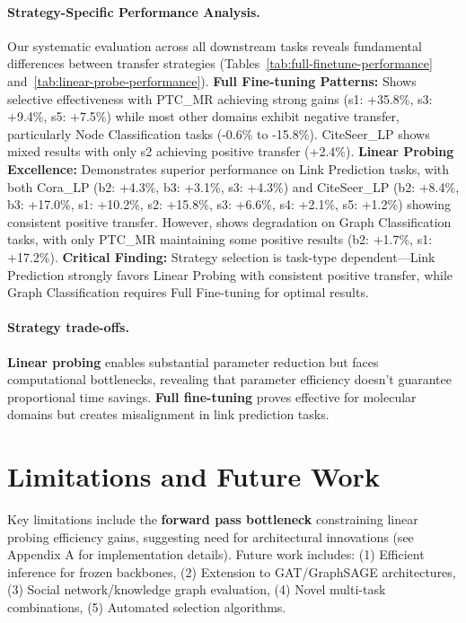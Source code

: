 \documentclass[11pt]{article}
\begin{document}
\paragraph{Strategy-Specific Performance Analysis.} Our systematic evaluation across all downstream tasks reveals fundamental differences between transfer strategies (Tables~\ref{tab:full-finetune-performance} and~\ref{tab:linear-probe-performance}). \textbf{Full Fine-tuning Patterns:} Shows selective effectiveness with PTC\_MR achieving strong gains (s1: +35.8\%, s3: +9.4\%, s5: +7.5\%) while most other domains exhibit negative transfer, particularly Node Classification tasks (-0.6\% to -15.8\%). CiteSeer\_LP shows mixed results with only s2 achieving positive transfer (+2.4\%). \textbf{Linear Probing Excellence:} Demonstrates superior performance on Link Prediction tasks, with both Cora\_LP (b2: +4.3\%, b3: +3.1\%, s3: +4.3\%) and CiteSeer\_LP (b2: +8.4\%, b3: +17.0\%, s1: +10.2\%, s2: +15.8\%, s3: +6.6\%, s4: +2.1\%, s5: +1.2\%) showing consistent positive transfer. However, shows degradation on Graph Classification tasks, with only PTC\_MR maintaining some positive results (b2: +1.7\%, s1: +17.2\%). \textbf{Critical Finding:} Strategy selection is task-type dependent—Link Prediction strongly favors Linear Probing with consistent positive transfer, while Graph Classification requires Full Fine-tuning for optimal results.


\paragraph{Strategy trade-offs.} \textbf{Linear probing} enables substantial parameter reduction but faces computational bottlenecks, revealing that parameter efficiency doesn't guarantee proportional time savings. \textbf{Full fine-tuning} proves effective for molecular domains but creates misalignment in link prediction tasks.


\section{Limitations and Future Work}

Key limitations include the \textbf{forward pass bottleneck} constraining linear probing efficiency gains, suggesting need for architectural innovations (see Appendix A for implementation details). Future work includes: (1) Efficient inference for frozen backbones, (2) Extension to GAT/GraphSAGE architectures, (3) Social network/knowledge graph evaluation, (4) Novel multi-task combinations, (5) Automated selection algorithms.
\end{document}
